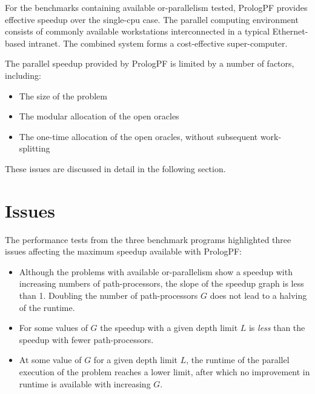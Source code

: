 For the benchmarks containing available or-parallelism tested, PrologPF provides
effective speedup over the single-cpu case.  The parallel computing environment
consists of commonly available workstations interconnected in a typical Ethernet-based
intranet.  The combined system forms a cost-effective super-computer.

The parallel speedup provided by PrologPF is limited by a number of factors, including:
\begin{itemize}
\item{The size of the problem}
\item{The modular allocation of the open oracles}
\item{The one-time allocation of the open oracles, without subsequent work-splitting}
\end{itemize}

These issues are discussed in detail in the following section.

\section{Issues} %
\label{bfp_issues}

The performance tests from the three benchmark programs highlighted three issues
affecting the maximum speedup available with PrologPF:
\begin{itemize}
\item{Although the problems with available or-parallelism show a speedup with increasing
  numbers of path-processors, the slope of the speedup graph is less than 1.  Doubling the
  number of path-processors $G$ does not lead to a halving of the runtime.}
\item{For some values of $G$ the speedup with a given depth limit $L$ is \textit{less} than
  the speedup with fewer path-processors.}
\item{At some value of $G$ for a given depth limit $L$, the runtime of the parallel
  execution of the problem reaches a lower limit, after which no improvement in runtime
  is available with increasing $G$.}
\end{itemize}

